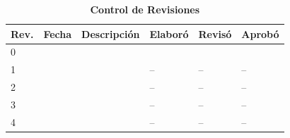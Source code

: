 \begin{titlepage}
	\begin{table}[h]
		\centering
		\caption*{\textbf{Control de Revisiones}}
		\label{tab:control_revisiones}
		\begin{tabularx}{\textwidth}{@{}llXlll@{}}
			\toprule
			\rowcolor{green!15}
			\textbf{Rev.} & \textbf{Fecha} & \textbf{Descripción} & \textbf{Elaboró} & \textbf{Revisó} & \textbf{Aprobó} \\
			\midrule
			0 & \fechaRevCero & \descRevCero & \firmaElaboro & \firmaReviso & \firmaAprobo \\
			1 & \fechaRevUno & \descRevUno & -- & -- & -- \\
			2 & \fechaRevDos & \descRevDos & -- & -- & -- \\
			3 & \fechaRevTres & \descRevTres & -- & -- & -- \\
			4 & \fechaRevCuatro & \descRevCuatro & -- & -- & -- \\
			\bottomrule
		\end{tabularx}
	\end{table}

\end{titlepage}

\newpage